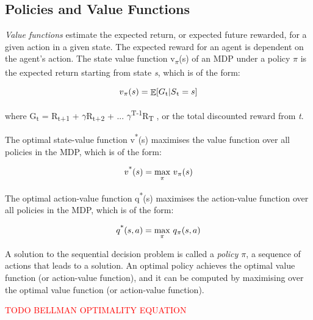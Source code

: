 \documentclass[12pt,twoside]{report}
\theoremstyle{plain}
\theoremstyle{definition}
\DeclareMathOperator{\E}{\mathbb{E}}
\begin{document}
\subsection{Policies and Value Functions}
\label{policy_value_functions_subsection}

\textit{Value functions} estimate the expected return, or expected future rewarded,  for a given action in a given state. The expected reward for an agent is dependent on the agent's action.  The state value function v\textsubscript{$\pi$}(s) of an MDP under a policy $\pi$ is the expected return starting from state \textit{s}, which is of the form:

\begin{equation}
v\textsubscript{$\pi$}(s) = \displaystyle \E [G\textsubscript{t} \vert S\textsubscript{t} = s]
\end{equation}

where G\textsubscript{t} = R\textsubscript{t+1} + $\gamma$R\textsubscript{t+2} + ... $\gamma$\textsuperscript{T-1}R\textsubscript{T} , or the total discounted reward from \textit{t}.

The optimal state-value function v\textsuperscript{*}(s) maximises the value function over all policies in the MDP, which is of the form:

\begin{equation}
v\textsuperscript{*}(s) = \underset{\pi}{\max} \ v\textsubscript{$\pi$}(s)
\end{equation}

The optimal action-value function q\textsuperscript{*}(s) maximises the action-value function over all policies in the MDP, which is of the form:

\begin{equation}
q\textsuperscript{*}(s, a) = \underset{\pi}{\max} \ q\textsubscript{$\pi$}(s, a)
\end{equation}

A solution to the sequential decision problem is called a \textit{policy $\pi$}, a sequence of actions that leads to a solution. An optimal policy achieves the optimal value function (or action-value function), and it can be computed by maximising over the optimal value function (or action-value function).

\textcolor{red}{TODO BELLMAN OPTIMALITY EQUATION}
\end{document}
